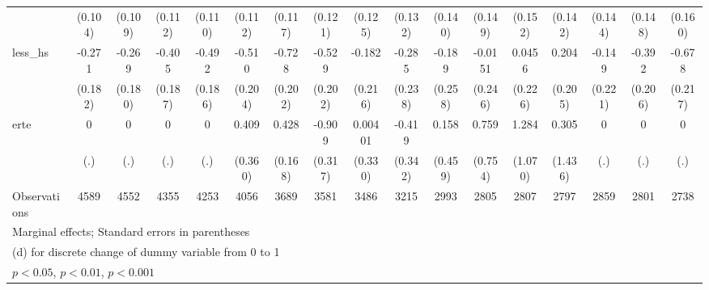 {\begin{tabular}{l*{16}{c}}
                    &     (0.104)         &     (0.109)         &     (0.112)         &     (0.110)         &     (0.112)         &     (0.117)         &     (0.121)         &     (0.125)         &     (0.132)         &     (0.140)         &     (0.149)         &     (0.152)         &     (0.142)         &     (0.144)         &     (0.148)         &     (0.160)         \\
[1em]
less\_hs             &      -0.271         &      -0.269         &      -0.405\sym{*}  &      -0.492\sym{**} &      -0.510\sym{*}  &      -0.728\sym{***}&      -0.529\sym{**} &      -0.182         &      -0.285         &      -0.189         &     -0.0151         &      0.0456         &       0.204         &      -0.149         &      -0.392         &      -0.678\sym{**} \\
                    &     (0.182)         &     (0.180)         &     (0.187)         &     (0.186)         &     (0.204)         &     (0.202)         &     (0.202)         &     (0.216)         &     (0.238)         &     (0.258)         &     (0.246)         &     (0.226)         &     (0.205)         &     (0.221)         &     (0.206)         &     (0.217)         \\
[1em]
erte                &           0         &           0         &           0         &           0         &       0.409         &       0.428\sym{*}  &      -0.909\sym{**} &     0.00401         &      -0.419         &       0.158         &       0.759         &       1.284         &       0.305         &           0         &           0         &           0         \\
                    &         (.)         &         (.)         &         (.)         &         (.)         &     (0.360)         &     (0.168)         &     (0.317)         &     (0.330)         &     (0.342)         &     (0.459)         &     (0.754)         &     (1.070)         &     (1.436)         &         (.)         &         (.)         &         (.)         \\
\hline
Observations        &        4589         &        4552         &        4355         &        4253         &        4056         &        3689         &        3581         &        3486         &        3215         &        2993         &        2805         &        2807         &        2797         &        2859         &        2801         &        2738         \\
\hline\hline
\multicolumn{17}{l}{\footnotesize Marginal effects; Standard errors in parentheses}\\
\multicolumn{17}{l}{\footnotesize  (d) for discrete change of dummy variable from 0 to 1}\\
\multicolumn{17}{l}{\footnotesize \sym{*} \(p<0.05\), \sym{**} \(p<0.01\), \sym{***} \(p<0.001\)}\\
\end{tabular}
}
